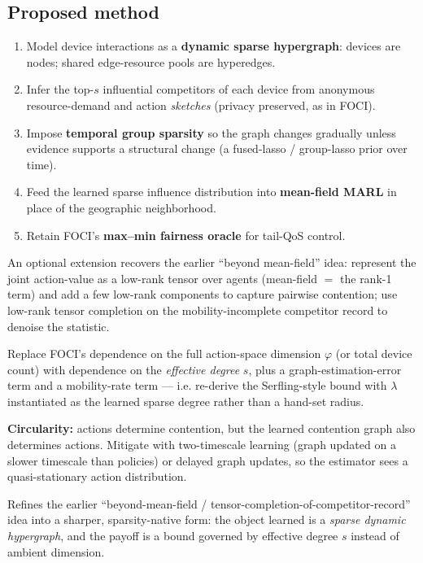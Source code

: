 \documentclass[11pt]{article}
\begin{document}
\subsection*{Proposed method}
\begin{enumerate}[leftmargin=1.5em,itemsep=1pt]
\item Model device interactions as a \textbf{dynamic sparse hypergraph}: devices are nodes; shared edge-resource pools are hyperedges.
\item Infer the top-$s$ influential competitors of each device from anonymous resource-demand and action \emph{sketches} (privacy preserved, as in FOCI).
\item Impose \textbf{temporal group sparsity} so the graph changes gradually unless evidence supports a structural change (a fused-lasso / group-lasso prior over time).
\item Feed the learned sparse influence distribution into \textbf{mean-field MARL} in place of the geographic neighborhood.
\item Retain FOCI's \textbf{max--min fairness oracle} for tail-QoS control.
\end{enumerate}
An optional extension recovers the earlier ``beyond mean-field'' idea: represent the joint
action-value as a low-rank tensor over agents (mean-field $=$ the rank-1 term) and add a
few low-rank components to capture pairwise contention; use low-rank tensor completion on
the mobility-incomplete competitor record to denoise the statistic.

\begin{theorybox}
Replace FOCI's dependence on the full action-space dimension $\varphi$ (or total device
count) with dependence on the \emph{effective degree} $s$, plus a graph-estimation-error
term and a mobility-rate term --- i.e. re-derive the Serfling-style bound with $\lambda$
instantiated as the learned sparse degree rather than a hand-set radius.
\end{theorybox}

\begin{riskbox}
\textbf{Circularity:} actions determine contention, but the learned contention graph also
determines actions. Mitigate with two-timescale learning (graph updated on a slower
timescale than policies) or delayed graph updates, so the estimator sees a quasi-stationary
action distribution.
\end{riskbox}

\begin{buildbox}
Refines the earlier ``beyond-mean-field / tensor-completion-of-competitor-record'' idea into
a sharper, sparsity-native form: the object learned is a \emph{sparse dynamic hypergraph},
and the payoff is a bound governed by effective degree $s$ instead of ambient dimension.
\end{buildbox}
\end{document}
